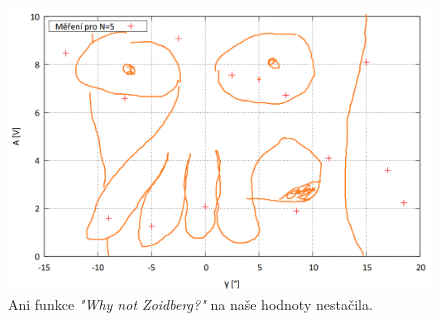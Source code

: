 \documentclass[english]{article}
\begin{document}
	\begin{figure}[p]
	\begin{center}
	    \vspace*{-1cm}
	    \includegraphics[width=\linewidth]{att/zoidberg.png}
	    \vspace*{-1cm}    
		\caption{Ani funkce \emph{"Why not Zoidberg?"} na naše hodnoty nestačila.}
		\label{fig:g_fun_3}
	\end{center}
	\end{figure}
		
\end{document}
